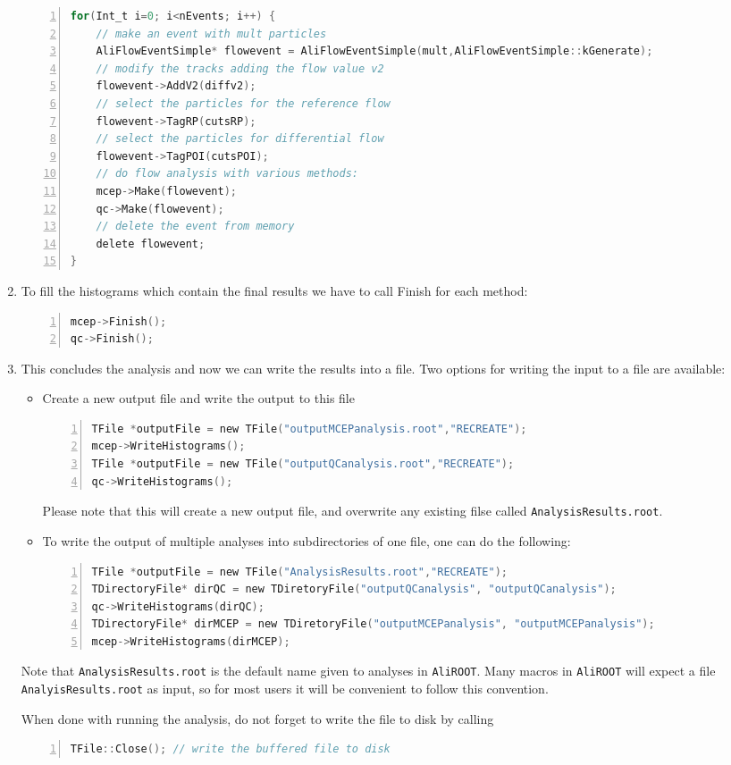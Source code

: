 \documentclass[a4paper]{book}
\numberwithin{equation}{subsection}
\begin{document}
\begin{enumerate}
	\begin{lstlisting}[language=C, numbers=left]
for(Int_t i=0; i<nEvents; i++) { 
    // make an event with mult particles 
    AliFlowEventSimple* flowevent = AliFlowEventSimple(mult,AliFlowEventSimple::kGenerate);
    // modify the tracks adding the flow value v2
    flowevent->AddV2(diffv2);
    // select the particles for the reference flow
    flowevent->TagRP(cutsRP);
    // select the particles for differential flow
    flowevent->TagPOI(cutsPOI);
    // do flow analysis with various methods:
    mcep->Make(flowevent);
    qc->Make(flowevent);
    // delete the event from memory
    delete flowevent;
} \end{lstlisting}
	\item To fill the histograms which contain the final results we have to call Finish for each method:
	\begin{lstlisting}[language=C, numbers=left]
mcep->Finish(); 
qc->Finish(); \end{lstlisting}
	\item This concludes the analysis and now we can write the results into a file. Two options for writing the input to a file are available: 
     \begin{itemize}
     \item Create a new output file and write the output to this file
     \begin{lstlisting}[language=C, numbers=left]
TFile *outputFile = new TFile("outputMCEPanalysis.root","RECREATE");
mcep->WriteHistograms();
TFile *outputFile = new TFile("outputQCanalysis.root","RECREATE");
qc->WriteHistograms();\end{lstlisting}

Please note that this will create a new output file, and overwrite any existing filse called \texttt{AnalysisResults.root}.

\item  To write the output of multiple analyses into subdirectories of one file, one can do the following:
\begin{lstlisting}[language=C, numbers=left]
TFile *outputFile = new TFile("AnalysisResults.root","RECREATE");
TDirectoryFile* dirQC = new TDiretoryFile("outputQCanalysis", "outputQCanalysis");
qc->WriteHistograms(dirQC);
TDirectoryFile* dirMCEP = new TDiretoryFile("outputMCEPanalysis", "outputMCEPanalysis");
mcep->WriteHistograms(dirMCEP);
\end{lstlisting}
\end{itemize}

Note that \texttt{AnalysisResults.root}  is the default name given to analyses in \texttt{AliROOT}. Many macros in \texttt{AliROOT} will expect a file \texttt{AnalyisResults.root} as input, so for most users it will be convenient to follow this convention.

When done with running the analysis, do not forget to write the file to disk by calling
\begin{lstlisting}[language=C, numbers=left]
TFile::Close();	// write the buffered file to disk \end{lstlisting}
\end{enumerate}
\end{document}
